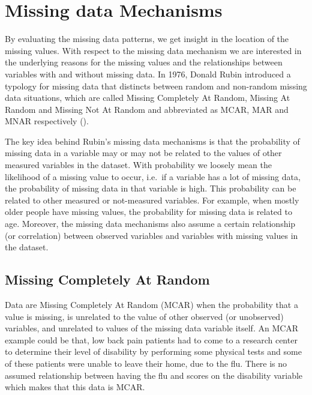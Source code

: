 \documentclass[
]{book}
\begin{document}
\hypertarget{missing-data-mechanisms}{%
\section{Missing data Mechanisms}\label{missing-data-mechanisms}}

By evaluating the missing data patterns, we get insight in the location of the missing values. With respect to the missing data mechanism we are interested in the underlying reasons for the missing values and the relationships between variables with and without missing data. In 1976, Donald Rubin introduced a typology for missing data that distincts between random and non-random missing data situations, which are called Missing Completely At Random, Missing At Random and Missing Not At Random and abbreviated as MCAR, MAR and MNAR respectively (\citet{Rubin1976}).

The key idea behind Rubin's missing data mechanisms is that the probability of missing data in a variable may or may not be related to the values of other measured variables in the dataset. With probability we loosely mean the likelihood of a missing value to occur, i.e.~if a variable has a lot of missing data, the probability of missing data in that variable is high. This probability can be related to other measured or not-measured variables. For example, when mostly older people have missing values, the probability for missing data is related to age. Moreover, the missing data mechanisms also assume a certain relationship (or correlation) between observed variables and variables with missing values in the dataset.

\hypertarget{missing-completely-at-random}{%
\subsection{Missing Completely At Random}\label{missing-completely-at-random}}

Data are Missing Completely At Random (MCAR) when the probability that a value is missing, is unrelated to the value of other observed (or unobserved) variables, and unrelated to values of the missing data variable itself. An MCAR example could be that, low back pain patients had to come to a research center to determine their level of disability by performing some physical tests and some of these patients were unable to leave their home, due to the flu. There is no assumed relationship between having the flu and scores on the disability variable which makes that this data is MCAR.
\end{document}

